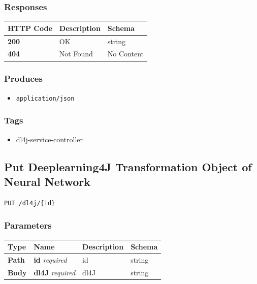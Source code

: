 \subsubsection{Responses}\label{responses-13}

\begin{longtable}[]{@{}lll@{}}
\toprule
HTTP Code & Description & Schema\tabularnewline
\midrule
\endhead
\textbf{200} & OK & string\tabularnewline
\textbf{404} & Not Found & No Content\tabularnewline
\bottomrule
\end{longtable}

\subsubsection{Produces}\label{produces-13}

\begin{itemize}
\tightlist
\item
  \texttt{application/json}
\end{itemize}

\subsubsection{Tags}\label{tags-13}

\begin{itemize}
\tightlist
\item
  dl4j-service-controller
\end{itemize}

\subsection{Put Deeplearning4J Transformation Object of Neural
Network}\label{put-deeplearning4j-transformation-object-of-neural-network}

\begin{verbatim}
PUT /dl4j/{id}
\end{verbatim}

\subsubsection{Parameters}\label{parameters-12}

\begin{longtable}[]{@{}llll@{}}
\toprule
Type & Name & Description & Schema\tabularnewline
\midrule
\endhead
\textbf{Path} & \textbf{id} \emph{required} & id & string\tabularnewline
\textbf{Body} & \textbf{dl4J} \emph{required} & dl4J &
string\tabularnewline
\bottomrule
\end{longtable}

